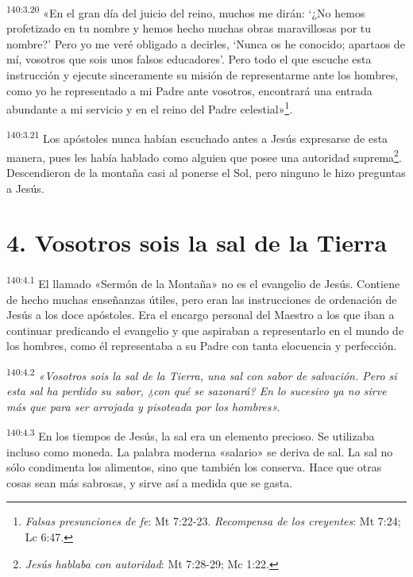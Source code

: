 \par 
\textsuperscript{140:3.20} «En el gran día del juicio del reino, muchos me dirán: `¿No hemos profetizado en tu nombre y hemos hecho muchas obras maravillosas por tu nombre?' Pero yo me veré obligado a decirles, `Nunca os he conocido; apartaos de mí, vosotros que sois unos falsos educadores'. Pero todo el que escuche esta instrucción y ejecute sinceramente su misión de representarme ante los hombres, como yo he representado a mi Padre ante vosotros, encontrará una entrada abundante a mi servicio y en el reino del Padre celestial»\footnote{\textit{Falsas presunciones de fe}: Mt 7:22-23. \textit{Recompensa de los creyentes}: Mt 7:24; Lc 6:47.}.

\par 
\textsuperscript{140:3.21} Los apóstoles nunca habían escuchado antes a Jesús expresarse de esta manera, pues les había hablado como alguien que posee una autoridad suprema\footnote{\textit{Jesús hablaba con autoridad}: Mt 7:28-29; Mc 1:22.}. Descendieron de la montaña casi al ponerse el Sol, pero ninguno le hizo preguntas a Jesús.

\section*{4. Vosotros sois la sal de la Tierra}
\par 
\textsuperscript{140:4.1} El llamado «Sermón de la Montaña» no es el evangelio de Jesús. Contiene de hecho muchas enseñanzas útiles, pero eran las instrucciones de ordenación de Jesús a los doce apóstoles. Era el encargo personal del Maestro a los que iban a continuar predicando el evangelio y que aspiraban a representarlo en el mundo de los hombres, como él representaba a su Padre con tanta elocuencia y perfección.

\par 
\textsuperscript{140:4.2} \textit{«Vosotros sois la sal de la Tierra, una sal con sabor de salvación. Pero si esta sal ha perdido su sabor, ¿con qué se sazonará? En lo sucesivo ya no sirve más que para ser arrojada y pisoteada por los hombres».}

\par 
\textsuperscript{140:4.3} En los tiempos de Jesús, la sal era un elemento precioso. Se utilizaba incluso como moneda. La palabra moderna «salario» se deriva de sal. La sal no sólo condimenta los alimentos, sino que también los conserva. Hace que otras cosas sean más sabrosas, y sirve así a medida que se gasta.

